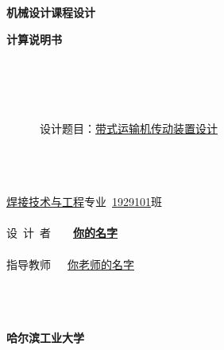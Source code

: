 \maketitle
\newpage
\begin{Huge}
	\begin{center}
		~\\
		~\\
		\textbf{机械设计课程设计}\par \textbf{计算说明书}\\
		~\\
		~\\
	\end{center}
\end{Huge}
\begin{Large}
	~\\
	~\\
	~~~~~~设计题目：\underline{带式运输机传动装置设计}
	~\\
	~\\
\end{Large}
\begin{Large}
	\begin{center}
		~\\
		~\\
		\underline{焊接技术与工程}专业~\underline{1929101}班 \\
		~\\
		设~计~者~~~~\textbf{\underline{你的名字}} \\
		~\\
		指导教师~~~\underline{你老师的名字} \\
		~\\
		\date{\today}
		~\\
		~\\
		\Large{\textbf{哈尔滨工业大学}}
	\end{center}
\end{Large}
